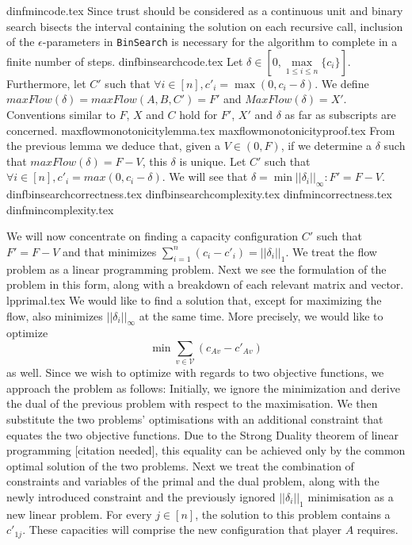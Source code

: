 \documentclass[11pt]{llncs}
\begin{document}
  {dinfmincode.tex}
  Since trust should be considered as a continuous unit and binary search bisects the interval containing the solution
  on each recursive call, inclusion of the $\epsilon$-parameters in \texttt{BinSearch} is necessary for the algorithm to
  complete in a finite number of steps.
  {dinfbinsearchcode.tex}
  Let $\delta \in \left[0, \max\limits_{1 \leq i \leq n}{\{c_i\}}\right]$. Furthermore, let $C'$ such that
  $\forall i \in \left[n\right], c'_i = \max{\left(0, c_i - \delta\right)}$. We define $maxFlow\left(\delta\right) = 
  maxFlow\left(A, B, C'\right) = F'$ and $MaxFlow\left(\delta\right) = X'$. Conventions similar to $F$, $X$ and $C$ hold
  for $F'$, $X'$ and $\delta$ as far as subscripts are concerned.
  {maxflowmonotonicitylemma.tex}
  {maxflowmonotonicityproof.tex}
  From the previous lemma we deduce that, given a $V \in \left(0, F\right)$, if we determine a $\delta$ such that
  $maxFlow\left(\delta\right) = F - V$, this $\delta$ is unique. Let $C'$ such that
  $\forall i \in [n], c'_i = max{\left(0, c_i - \delta\right)}$. We will see that
  $\delta = \min{||\delta_i||_\infty} : F' = F - V$.
  {dinfbinsearchcorrectness.tex}
  {dinfbinsearchcomplexity.tex}
  {dinfmincorrectness.tex}
  {dinfmincomplexity.tex}

  We will now concentrate on finding a capacity configuration $C'$ such that $F' = F - V$ and that minimizes
  $\sum\limits_{i=1}^{n}\left(c_i-c'_i\right) = ||\delta_i||_1$. We treat the flow problem as a linear programming problem.
  Next we see the formulation of the problem in this form, along with a breakdown of each relevant matrix and vector.
  {lpprimal.tex}
  We would like to find a solution that, except for maximizing the flow, also minimizes $||\delta_i||_\infty$ at the same time.
  More precisely, we would like to optimize
  \begin{equation*}
    \min{\sum\limits_{v \in \mathcal{V}}\left(c_{Av} - c'_{Av}\right)}
  \end{equation*}
  as well.
  Since we wish to optimize with regards to two objective functions, we approach the problem as follows: Initially, we ignore
  the minimization and derive the dual of the previous problem with respect to the maximisation. We then substitute the two
  problems' optimisations with an additional constraint that equates the two objective functions. Due to the Strong Duality
  theorem of linear programming [citation needed], this equality can be achieved only by the common optimal solution of the
  two problems. Next we treat the combination of constraints and variables of the primal and the dual problem, along with the
  newly introduced constraint and the previously ignored $||\delta_i||_1$ minimisation as a new linear problem. For every
  $j \in \left[n\right]$, the solution to this problem contains a $c'_{1j}$. These capacities will comprise the new
  configuration that player $A$ requires.
\end{document}
